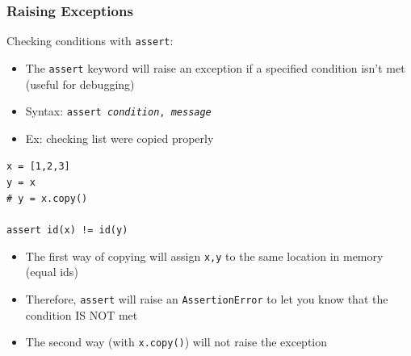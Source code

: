 \documentclass{beamer}
\newcommand{\code}[1]{\texttt{#1}}
\newcommand{\tab}{\hspace*{22pt}}
\begin{document}
\begin{frame}	
	\frametitle{Raising Exceptions}
	
	\begin{block}{Checking conditions with \code{assert}:}
		\begin{itemize}
			\item The \code{assert} keyword will raise an exception if a specified condition isn't met (useful for debugging)
			\item Syntax: \code{assert \emph{condition}, \emph{message}}
			\item Ex: checking list were copied properly
		\end{itemize}
		
		\vspace{10pt}
			\code{x = [1,2,3] \\
					y = x \\
					\# y = x.copy() \\
					\tab \\
					assert id(x) != id(y)
			}
		\endminipage\hfill
			\begin{itemize}
				\item The first way of copying will assign \code{x,y} to the same location in memory (equal ids)
				\item Therefore, \code{assert} will raise an \code{AssertionError} to let you know that the condition IS NOT met
				\item The second way (with \code{x.copy()}) will not raise the exception
			\end{itemize}
		\endminipage\hfill
	\end{block}
	
\end{frame}
\end{document}
